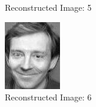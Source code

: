 \documentclass[12pt]{article}
\begin{document}
\begin{figure}
\begin{subfigure}[b]{0.20\textwidth}
		\caption{Reconstructed Image: 5}
	\end{subfigure}\quad
	\begin{subfigure}[b]{0.20\textwidth}
		\includegraphics[width=\textwidth]{Task4.3_Images/ReconstructedImage6.jpg}
		\caption{Reconstructed Image: 6}
	\end{subfigure}\quad
	\begin{subfigure}[b]{0.20\textwidth}

\end{subfigure}
\end{figure}
\end{document}
